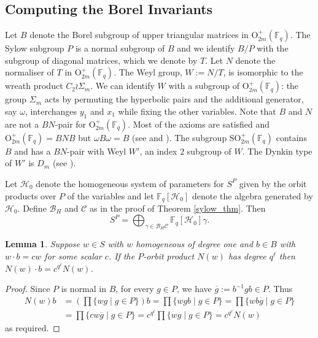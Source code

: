 \documentclass{amsart}
\newcommand{\field}{\mathbb{F}}
\newcommand{\orthp}[2]{{{\text{O}^{+}_{{#1}}(\field_{#2})}}}
\newcommand{\sorthp}[2]{{{\text{SO}^{+}_{{#1}}(\field_{#2})}}}
\newcommand{\HH}{\mathcal{H}}
\newcommand{\BH}{\mathcal{B}_H}
\newtheorem{lem}[subsection]{Lemma}
\begin{document}
\subsection{Computing the Borel Invariants} \label{Borel_inv}

Let $B$ denote the Borel subgroup of upper triangular matrices in $\orthp{2m}{q}$. 
The Sylow subgroup $P$ is a normal subgroup of $B$ and we identify $B/P$ with the subgroup of diagonal matrices, which we denote by $T$.
Let $N$ denote the normaliser of $T$ in $\orthp{2m}{q}$.
The Weyl group, $W:=N/T$, is isomorphic to the wreath product $C_2\wr \Sigma_m$. We can identify $W$ with a subgroup of
$\orthp{2m}{q}$: the group $\Sigma_m$ acts by permuting the hyperbolic pairs
and the additional generator, say $\omega$, interchanges $y_1$ and $x_1$
while fixing the other variables.
Note that $B$ and $N$ are not a $BN$-pair for $\orthp{2m}{q}$.
Most of the axioms are satisfied and $\orthp{2m}{q}=BNB$
but $\omega B\omega=B$ (see \cite[p. 85]{taylor-classicalgroups:92}
and \cite[\S1.7.5]{geck-alggrps:03}).
The subgroup $\sorthp{2m}{q}$ contains $B$ and has a $BN$-pair
with Weyl $W'$, an index $2$ subgroup of $W$. The Dynkin type of $W'$ is
$D_m$ (see \cite[\S1.7.9, \S1.3.16]{geck-alggrps:03}).

Let $\HH_0$ denote the homogeneous system of parameters for $S^P$ given by the orbit products over $P$ of the variables 
and let $\field_q[\HH_0]$ denote the algebra generated by $\HH_0$. Define $\BH$ and $\mathcal{C}$ as in the proof of Theorem \ref{sylow_thm}.
Then
$$S^P=\bigoplus_{\gamma\in\BH\mathcal{C}} \field_q[\HH_0]\gamma.$$

\begin{lem} \label{borel_lem} Suppose $w\in S$ with $w$ homogeneous of degree one  and $b\in B$ with $w\cdot b=c w$ for some scalar $c$.
If the $P$-orbit product $N(w)$ has degree $q^\ell$ then $N(w)\cdot b=c^{q^\ell}N(w)$.
\end{lem}
\begin{proof} Since $P$ is normal in $B$, for every $g\in P$, we have $\overline{g}:=b^{-1}gb\in P$.
Thus 
\begin{align*}
N(w)b&=\left(\prod\{wg\mid g \in P\}\right)b=\prod\{wgb\mid g\in P\}=\prod\{wb\overline{g}\mid g\in P\}\\
             &=\prod\{cw\overline{g}\mid g\in P\}=c^{q^\ell}\prod\{wg\mid g\in P\}=c^{q^\ell}N(w)
\end{align*}   
as required.          
\end{proof}
\end{document}
